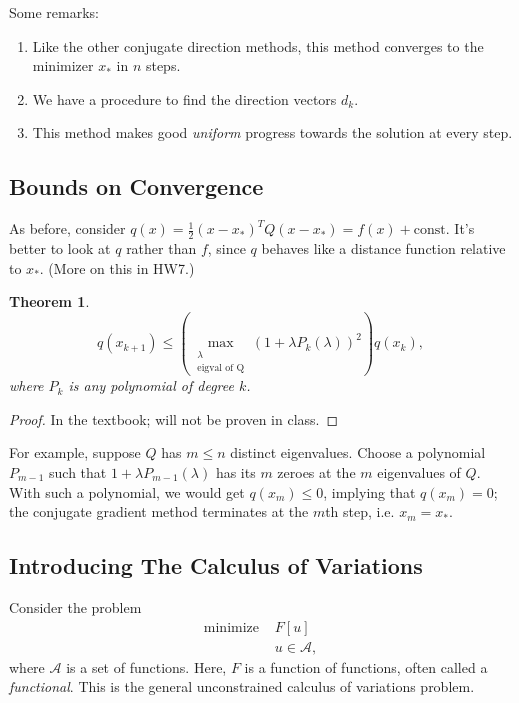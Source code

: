 \documentclass[11pt]{book}
\newtheorem{theorem}{Theorem}[subsection]
\begin{document}
Some remarks:
\begin{enumerate}
\item
Like the other conjugate direction methods, this method converges to the minimizer $x_*$ in $n$ steps.
\item
We have a procedure to find the direction vectors $d_k$.
\item
This method makes good \emph{uniform} progress towards the solution at every step.
\end{enumerate}

\subsection{Bounds on Convergence}

As before, consider $q(x) = \frac{1}{2}(x-x_*)^TQ(x-x_*) = f(x) + \text{const}$. It's better to look at $q$ rather than $f$, since $q$ behaves like a distance function relative to $x_*$. (More on this in HW7.)

\begin{theorem}
\[
q(x_{k+1}) \leq \left( \max_{\substack{\lambda \\ \text{eigval of Q}}} (1 + \lambda P_k(\lambda))^2 \right) q(x_k),
\]
where $P_k$ is any polynomial of degree $k$.
\end{theorem}
\begin{proof}
In the textbook; will not be proven in class.
\end{proof}

For example, suppose $Q$ has $m \leq n$ distinct eigenvalues. Choose a polynomial $P_{m-1}$ such that $1 + \lambda P_{m-1}(\lambda)$ has its $m$ zeroes at the $m$ eigenvalues of $Q$. With such a polynomial, we would get $q(x_m) \leq 0$, implying that $q(x_m) = 0$; the conjugate gradient method terminates at the $m$th step, i.e. $x_m=x_*$.

\subsection{Introducing The Calculus of Variations}

Consider the problem
\begin{align*}
\text{minimize } &F[u] \\
&u \in \mathcal{A},
\end{align*}
where $\mathcal{A}$ is a set of functions. Here, $F$ is a function of functions, often called a \emph{functional}. This is the general unconstrained calculus of variations problem.
\end{document}
